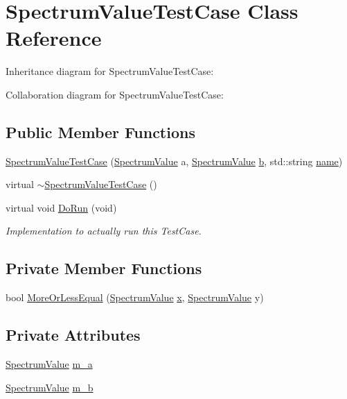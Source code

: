 \hypertarget{classSpectrumValueTestCase}{}\section{Spectrum\+Value\+Test\+Case Class Reference}
\label{classSpectrumValueTestCase}


Inheritance diagram for Spectrum\+Value\+Test\+Case\+:


Collaboration diagram for Spectrum\+Value\+Test\+Case\+:
\subsection*{Public Member Functions}
\begin{DoxyCompactItemize}
\item 
\hyperlink{classSpectrumValueTestCase_a98a915a702f1d44dda94388fcd08aace}{Spectrum\+Value\+Test\+Case} (\hyperlink{classns3_1_1SpectrumValue}{Spectrum\+Value} a, \hyperlink{classns3_1_1SpectrumValue}{Spectrum\+Value} \hyperlink{lte__pathloss_8m_a21ad0bd836b90d08f4cf640b4c298e7c}{b}, std\+::string \hyperlink{generate__test__data__lte__spectrum__model_8m_ab74e6bf80237ddc4109968cedc58c151}{name})
\item 
virtual \hyperlink{classSpectrumValueTestCase_aa951549cc1e00f89334de005db9f4f12}{$\sim$\+Spectrum\+Value\+Test\+Case} ()
\item 
virtual void \hyperlink{classSpectrumValueTestCase_a9c8f444c8454b488a12e934a18fb9555}{Do\+Run} (void)
\begin{DoxyCompactList}\small\item\em Implementation to actually run this Test\+Case. \end{DoxyCompactList}\end{DoxyCompactItemize}
\subsection*{Private Member Functions}
\begin{DoxyCompactItemize}
\item 
bool \hyperlink{classSpectrumValueTestCase_a273675ffa83634c76ce0d26bdf6a2c05}{More\+Or\+Less\+Equal} (\hyperlink{classns3_1_1SpectrumValue}{Spectrum\+Value} \hyperlink{lte__link__budget__x2__handover__measures_8m_a9336ebf25087d91c818ee6e9ec29f8c1}{x}, \hyperlink{classns3_1_1SpectrumValue}{Spectrum\+Value} y)
\end{DoxyCompactItemize}
\subsection*{Private Attributes}
\begin{DoxyCompactItemize}
\item 
\hyperlink{classns3_1_1SpectrumValue}{Spectrum\+Value} \hyperlink{classSpectrumValueTestCase_a8e77c9fc489d333525cb64e3dae710f2}{m\+\_\+a}
\item 
\hyperlink{classns3_1_1SpectrumValue}{Spectrum\+Value} \hyperlink{classSpectrumValueTestCase_a5482ae2981fb74b78bbd88bc690c43c7}{m\+\_\+b}
\end{DoxyCompactItemize}

